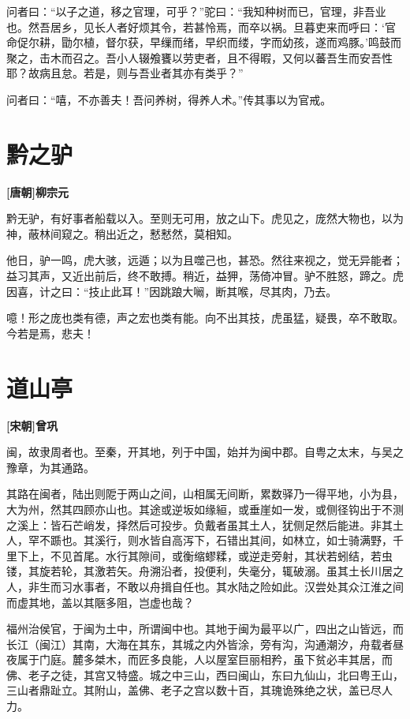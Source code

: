 \documentclass[UTF8,titlepage,oneside]{ctexbook}
\begin{document}
问者曰：“以子之道，移之官理，可乎？”驼曰：“我知种树而已，官理，非吾业也。然吾居乡，见长人者好烦其令，若甚怜焉，而卒以祸。旦暮吏来而呼曰：‘官命促尔耕，勖尔植，督尔获，早缫而绪，早织而缕，字而幼孩，遂而鸡豚。’鸣鼓而聚之，击木而召之。吾小人辍飧饔以劳吏者，且不得暇，又何以蕃吾生而安吾性耶？故病且怠。若是，则与吾业者其亦有类乎？”

问者曰：“嘻，不亦善夫！吾问养树，得养人术。”传其事以为官戒。


\chapter*{黔之驴}
\begin{center}
	\textbf{[唐朝]柳宗元}
\end{center}

黔无驴，有好事者船载以入。至则无可用，放之山下。虎见之，庞然大物也，以为神，蔽林间窥之。稍出近之，慭慭然，莫相知。

他日，驴一鸣，虎大骇，远遁；以为且噬己也，甚恐。然往来视之，觉无异能者；益习其声，又近出前后，终不敢搏。稍近，益狎，荡倚冲冒。驴不胜怒，蹄之。虎因喜，计之曰：“技止此耳！”因跳踉大㘎，断其喉，尽其肉，乃去。

噫！形之庞也类有德，声之宏也类有能。向不出其技，虎虽猛，疑畏，卒不敢取。今若是焉，悲夫！


\chapter*{道山亭}
\begin{center}
	\textbf{[宋朝]曾巩}
\end{center}

闽，故隶周者也。至秦，开其地，列于中国，始并为闽中郡。自粤之太末，与吴之豫章，为其通路。


其路在闽者，陆出则阸于两山之间，山相属无间断，累数驿乃一得平地，小为县，大为州，然其四顾亦山也。其途或逆坂如缘絙，或垂崖如一发，或侧径钩出于不测之溪上：皆石芒峭发，择然后可投步。负戴者虽其土人，犹侧足然后能进。非其土人，罕不踬也。其溪行，则水皆自高泻下，石错出其间，如林立，如士骑满野，千里下上，不见首尾。水行其隙间，或衡缩蟉糅，或逆走旁射，其状若蚓结，若虫镂，其旋若轮，其激若矢。舟溯沿者，投便利，失毫分，辄破溺。虽其土长川居之人，非生而习水事者，不敢以舟揖自任也。其水陆之险如此。汉尝处其众江淮之间而虚其地，盖以其陿多阻，岂虚也哉？


福州治侯官，于闽为土中，所谓闽中也。其地于闽为最平以广，四出之山皆远，而长江（闽江）其南，大海在其东，其城之内外皆涂，旁有沟，沟通潮汐，舟载者昼夜属于门庭。麓多桀木，而匠多良能，人以屋室巨丽相矜，虽下贫必丰其居，而佛、老子之徒，其宫又特盛。城之中三山，西曰闽山，东曰九仙山，北曰粤王山，三山者鼎趾立。其附山，盖佛、老子之宫以数十百，其瑰诡殊绝之状，盖已尽人力。
\end{document}

